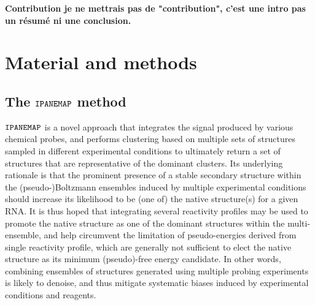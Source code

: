 \documentclass[a4,center,fleqn]{NAR}
\newcommand{\Software}[1]{$\text{\ttfamily #1}$}
\newcommand{\OurTool}{\Software{IPANEMAP}\xspace}
\newcommand{\Blabla}[1][5-6]{{\color{blue!40!white}\lipsum*[#1]}}
\begin{document}
{\noindent\bf Contribution je ne mettrais pas de "contribution", c'est une intro pas un résumé ni une conclusion.}
\Blabla[7-8]

\section{Material and methods}

\subsection{The \OurTool{} method}

\OurTool{} is a novel approach that integrates the signal produced by various chemical probes, and performs clustering based on multiple sets of structures sampled in different experimental conditions to ultimately return a set of structures that are representative of the dominant clusters. Its underlying rationale is that the prominent presence of a stable secondary structure within the  (pseudo-)Boltzmann ensembles induced by multiple experimental conditions should increase its likelihood to be (one of) the native structure(s) for a given RNA. It is thus hoped that integrating several reactivity profiles may be used to promote the native structure as one of the dominant structures within the multi-ensemble, and help circumvent the limitation of pseudo-energies derived from single reactivity profile, which are generally not sufficient to elect the native structure as its minimum (pseudo)-free energy candidate. In other words, combining ensembles of structures generated using multiple probing experiments is likely to denoise, and thus mitigate systematic biases induced by experimental conditions and reagents.
\end{document}
